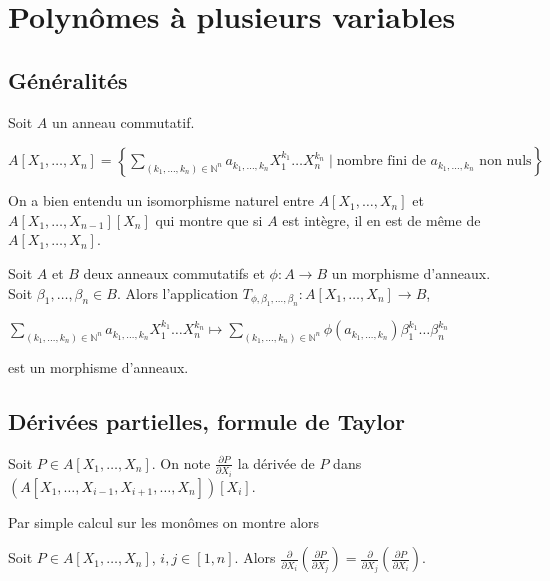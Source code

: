 \section{Polynômes à plusieurs variables}

\subsection{Généralités}

\begin{de}
Soit $A$ un anneau commutatif.

$A[X_1,\ldots,X_n] = \left\{\sum_{(k_1,\ldots,k_n)\in\mathbb{N}^n} a_{k_1,\ldots,k_n} X_1^{k_1}\ldots X_n^{k_n} \mid \text{nombre fini de } a_{k_1,\ldots,k_n} \text{ non nuls}\right\}$
\end{de}

\begin{rem}
On a bien entendu un isomorphisme naturel entre $A[X_1,\ldots,X_n]$ et $A[X_1,\ldots,X_{n-1}][X_n]$ qui montre que si $A$ est intègre, il en est de même de $A[X_1,\ldots,X_n]$.
\end{rem}

\begin{prop}
Soit $A$ et $B$ deux anneaux commutatifs et $\phi:A \rightarrow B$ un morphisme d'anneaux. Soit $\beta_1,\ldots,\beta_n \in B$. Alors l'application $T_{\phi,\beta_1,\ldots,\beta_n}:A[X_1,\ldots,X_n] \rightarrow B$,

$\sum_{(k_1,\ldots,k_n)\in\mathbb{N}^n} a_{k_1,\ldots,k_n} X_1^{k_1}\ldots X_n^{k_n} \mapsto \sum_{(k_1,\ldots,k_n)\in\mathbb{N}^n} \phi(a_{k_1,\ldots,k_n}) \beta_1^{k_1}\ldots \beta_n^{k_n}$

est un morphisme d'anneaux.
\end{prop}

\subsection{Dérivées partielles, formule de Taylor}

\begin{de}
Soit $P \in A[X_1,\ldots,X_n]$. On note $\frac{\partial P}{\partial X_i}$ la dérivée de $P$ dans $(A[X_1,\ldots,X_{i-1},X_{i+1},\ldots,X_n])[X_i]$.
\end{de}

Par simple calcul sur les monômes on montre alors

\begin{lem}[Schwarz]
Soit $P \in A[X_1,\ldots,X_n]$, $i,j \in [1,n]$. Alors $\frac{\partial}{\partial X_i} (\frac{\partial P}{\partial X_j}) = \frac{\partial}{\partial X_j} (\frac{\partial P}{\partial X_i})$.
\end{lem}

